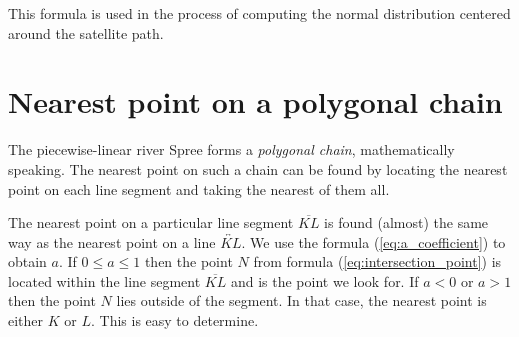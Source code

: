 \documentclass[a4paper,12pt]{article}
\begin{document}
This formula is used in the process of computing the normal distribution centered around the satellite path.

\section{Nearest point on a polygonal chain}

The piecewise-linear river Spree forms a \emph{polygonal chain}, mathematically speaking.
The nearest point on such a chain can be found by locating the nearest point on each line segment and
taking the nearest of them all.

The nearest point on a particular line segment \(\overline{KL}\)
is found (almost) the same way as the nearest point on a line \(\overleftrightarrow{KL}\).
We use the formula (\ref{eq:a_coefficient}) to obtain \(a\).
If \(0 \leq a \leq 1\) then the point \(N\) from formula (\ref{eq:intersection_point})
is located within the line segment \(\overline{KL}\) and is the point we look for.
If \(a < 0\) or \(a > 1\) then the point \(N\) lies outside of the segment. In that case, the nearest point
is either \(K\) or \(L\). This is easy to determine.
\end{document}
